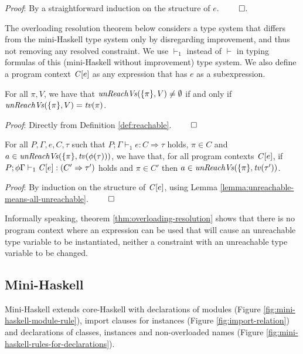 {\em Proof\/}: By a straightforward induction on the structure of $e$. $\qed$.

The overloading resolution theorem below considers a type system that
differs from the mini-Haskell type system only by disregarding
improvement, and thus not removing any resolved constraint. We use
$\vdash_1$ instead of $\vdash$ in typing formulas of this
(mini-Haskell without improvement) type system. We also define a
program context $\mathit{C\/}[e]$ as any expression that has $e$ as a
subexpression.

\begin{Lemma}
  \label{lemma:unreachable-means-all-unreachable}
  For all $\pi, V$, we have that $\text{\it unReachVs\/}(\{\pi\},V)\not=\emptyset$
  if and only if $\text{\it unReachVs\/}(\{\pi\},V)={\it tv\/}(\pi)$.
\end{Lemma}

{\em Proof\/}: Directly from Definition \ref{def:reachable}. $\qed$

\begin{Theorem}
  For all $P, \Gamma, e, C, \tau$ such that $P;\Gamma \vdash_1 e:
  C\Rightarrow \tau$ holds, $\pi\in C$ and
  $a\in\text{\it unReachVs\/}(\{\pi\},{\it tv\/}(\phi(\tau)))$, we have that, for
  all program contexts $\mathit{C\/}[e]$, if $P;\phi\Gamma \vdash_1 \mathit{C\/}[e]:
  (C'\Rightarrow \tau')$ holds and $\pi \in C'$ then $a\in
  \text{\it unReachVs\/}(\{\pi\},{\it tv\/}(\tau'))$.
\label{thm:overloading-resolution}
\end{Theorem}

{\em Proof\/}: By induction on the structure of $\mathit{C\/}[e]$, using Lemma
\ref{lemma:unreachable-means-all-unreachable}. $\qed$

Informally speaking, theorem \ref{thm:overloading-resolution} shows
that there is no program context where an expression can be used that
will cause an unreachable type variable to be instantiated, neither a
constraint with an unreachable type variable to be changed.

\subsection{Mini-Haskell}
\label{sec:mini-Haskell}

Mini-Haskell extends core-Haskell with declarations of modules (Figure
\ref{fig:mini-haskell-module-rule}), import clauses for instances
(Figure \ref{fig:import-relation}) and declarations of classes,
instances and non-overloaded names (Figure
\ref{fig:mini-haskell-rules-for-declarations}).

